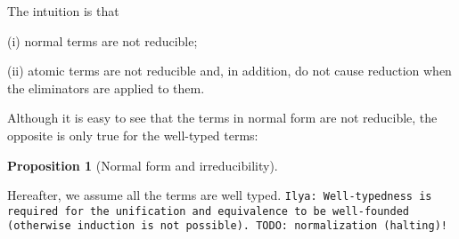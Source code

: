 \documentclass[a4,natbib=false]{article}
\newtheorem{definition}{Definition}
\newtheorem{proposition}{Proposition}
\newcommand{\ilyam}[1]{{\color{red} \texttt{Ilya:  #1}}}
\newcommand{\bnfalt}{\;\;|\;\;}
\newcommand{\fun}[2]{\lambda {#1}.\,{#2}}
\newcommand{\letname}{\mathsf{let}}
\newcommand{\dletname}{\mathsf{dlet}}
\newcommand{\letval}[3]{\letname\; {#1} \,:=\, {#2} \;\mathsf{in}\; {#3}}
\newcommand{\dletval}[3]{\dletname\; {#1} \,:=\, {#2} \;\mathsf{in}\; {#3}}
\newcommand{\pair}[2]{\left\langle{#1}, {#2}\right\rangle}
\newcommand{\valtocomp}[1]{\uparrow \hspace{-2pt} #1}
\newcommand{\pitype}[2]{\Pi {#1}.\,#2}
\newcommand{\foralltype}[2]{\forall {#1}.\,#2}
\newcommand{\refl}{\mathsf{refl}}
\newcommand{\force}[1]{\mathsf{force}\,{#1}}
\newcommand{\return}[1]{\mathsf{return}\,{#1}}
\newcommand{\thunk}[1]{\{{#1}\}}
\newcommand{\recsigma}[3]{\mathsf{rec}_{\Sigma}^{#2}({#1},{#3})}
\newcommand{\receq}[3]{\mathsf{rec}_{\mathsf{eq}}^{#2}({#1},{#3})}
\newcommand{\reduces}[2]{{#1} \rightarrow {#2}}
\newcommand{\judgeSnf}[1]{{#1}\,\mathsf{NF}}
\newcommand{\Infer}[3]{\inferrule*[right={#1}]{#2}{#3}}
\begin{document}
The intuition is that
\begin{enumerate*}
\item[(i)] normal terms are not reducible;
\item[(ii)] atomic terms are not reducible and, in addition, do not cause
  reduction when the eliminators are applied to them.
\end{enumerate*}

Although it is easy to see that the terms in normal form are not reducible,
the opposite is only true for the well-typed terms:

\begin{proposition}[Normal form and irreducibility]
  \label{prop:nf-irred}
\end{proposition}

Hereafter, we assume all the terms are well typed.
\ilyam{Well-typedness is required for the unification and equivalence to be
  well-founded (otherwise induction is not possible). TODO: normalization (halting)!}




\end{document}
